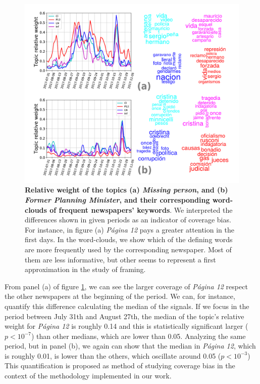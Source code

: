 \documentclass[a4paper, 12pt]{article}
\begin{document}
\begin{figure}[H]
\centering
\includegraphics[width = \textwidth]{images/Fig7.pdf}
\caption{\textbf{Relative weight of the topics (a) \emph{Missing person}, and (b) \emph{Former Planning Minister}, and their corresponding word-clouds of frequent newspapers' keywords}. We interpreted the differences shown in given periods as an indicator of coverage bias. For instance, in figure (a) \emph{P\'agina 12} pays a greater attention in the first days. In the word-clouds, we show which of the defining words are more frequently used by the corresponding newspaper. Most of them are less informative, but other seems to represent a first approximation in the study of framing.}
\label{fig:topics_temporal_profiles}
\end{figure}

\par From panel (a) of figure \ref{fig:topics_temporal_profiles}, we can see the larger coverage of \emph{P\'agina 12} respect the other newspapers at the beginning of the period. We can, for instance, quantify this difference calculating  the median of the signals. If we focus in the period between July 31th and August 27th, the median of the topic's relative weight for \emph{P\'agina 12} is roughly 0.14 and this is statistically significant larger ($p < 10^{-7}$) than other medians, which are lower than 0.05.
Analyzing the same period, but in panel (b), we again can show that the median in \emph{P\'agina 12}, which is roughly 0.01, is lower than the others, which oscillate around 0.05 ($p<10^{-3}$)
This quantification is proposed as method of studying coverage bias in the context of the methodology implemented in our work. 
\end{document}
